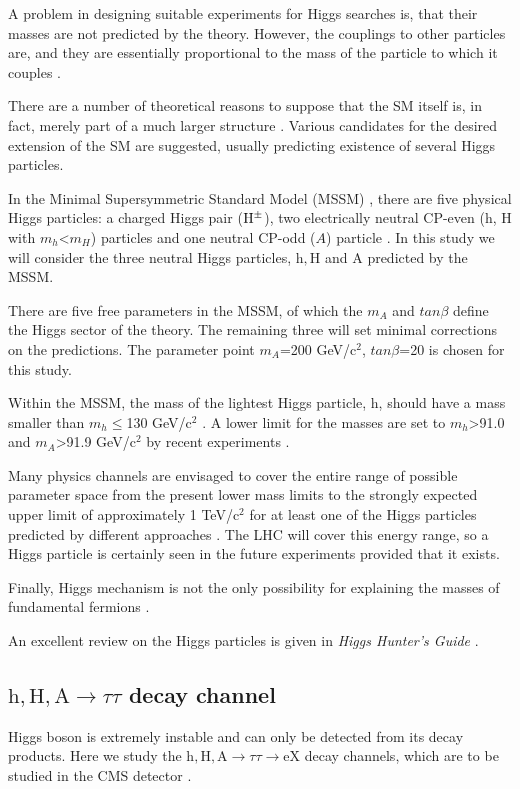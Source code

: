 \documentclass[a4paper,12pt,titlepage]{article}
\begin{document}
A problem in designing suitable experiments for Higgs searches is, that their masses are not predicted by the theory. However, the couplings to other particles are, and they are essentially proportional to the mass of the particle to which it couples \cite{MartinShaw}.

There are a number of theoretical reasons to suppose that the SM itself is, in fact, merely part of a much larger structure \cite{HHunter}. Various candidates for the desired extension of the SM are suggested, usually predicting existence of several Higgs particles.

In the Minimal Supersymmetric Standard Model (MSSM) \cite{MSSM}, there are five physical Higgs particles: a charged Higgs pair ($\mbox{$\mathrm{H}^{\pm}$}$), two electrically neutral CP-even ($\mathrm{h}$, $\mathrm{H}$ with $m_{h}$<$m_{H}$) particles and one neutral CP-odd ($A$) particle \cite{Kane}. In this study we will consider the three neutral Higgs particles, $\mathrm{h, H}$ and $\mathrm{A}$ predicted by the MSSM. 

There are five free parameters in the MSSM, of which the $m_A$ and $tan\beta$ define the Higgs sector of the theory. The remaining three will set minimal corrections on the predictions. The parameter point $m_A$=200 GeV/c$^2$, $tan\beta$=20 is chosen for this study.

Within the MSSM, the mass of the lightest Higgs particle, $\mathrm{h}$, should have a mass smaller than $m_{h}\leq$130 GeV/c$^2$ \cite{hUppLimit}. A lower limit for the masses are set to $m_{h}$>91.0 and $m_{A}$>91.9 GeV/c$^2$ by recent experiments \cite{HLowLimit}. 

Many physics channels are envisaged to cover the entire range of possible parameter space from the present lower mass limits to the strongly expected upper limit of approximately 1 TeV/c$^2$ for at least one of the Higgs particles predicted by different approaches \cite{HHunter}. The LHC will cover this energy range, so a Higgs particle is certainly seen in the future experiments provided that it exists.

Finally, Higgs mechanism is not the only possibility for explaining the masses of fundamental fermions \cite{HHunter, L1Trigger}. 

An excellent review on the Higgs particles is given in \emph{Higgs Hunter's Guide} \cite{HHunter}.

\subsection{$\mathrm{h, H, A} \rightarrow \tau \tau$ decay channel}
Higgs boson is extremely instable and can only be detected from its decay products. Here we study the $\mathrm{h, H, A} \rightarrow \tau \tau \rightarrow \mathrm{eX}$ decay channels, which are to be studied in the CMS detector \cite{TechPropCMS, CMSNote98:019andCR00009}. 
\end{document}
